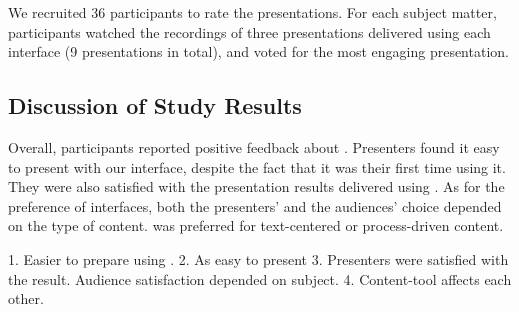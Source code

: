 We recruited 36 participants to rate the presentations. For each subject matter, participants watched the recordings of three presentations delivered using each interface (9 presentations in total), and voted for the most engaging presentation. 

\subsection{Discussion of Study Results}
Overall, participants reported positive feedback about \interface. Presenters found it easy to present with our interface, despite the fact that it was their first time using it. They were also satisfied with the presentation results delivered using \interface. As for the preference of interfaces, both the presenters' and the audiences' choice depended on the type of content. \interface was preferred for text-centered or process-driven content. 

1. Easier to prepare using \interface.
2. As easy to present
3. Presenters were satisfied with the result. Audience satisfaction depended on subject. 
4. Content-tool affects each other.













